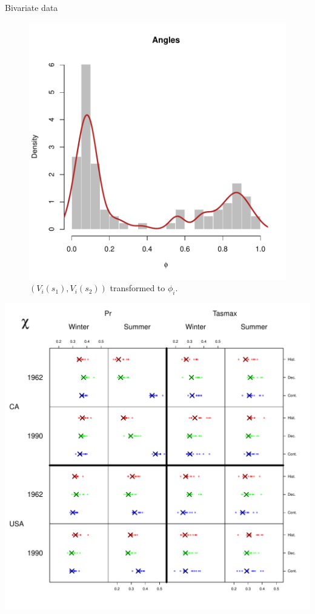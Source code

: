 \documentclass[mathserif, 11pt, t]{beamer}
\begin{document}
\begin{frame}{Bivariate data}
\begin{figure}
\begin{center}
\includegraphics[scale=0.34]{figs/biv_phi.pdf}
\end{center}
\caption{$(V_i(s_1), V_i(s_2))$ transformed to $ \phi_i$.}
\end{figure}
\end{frame}


\begin{frame}
\begin{center}
\includegraphics[scale=0.34]{figs/chi4.pdf}
\end{center}
\end{frame}
\end{document}
